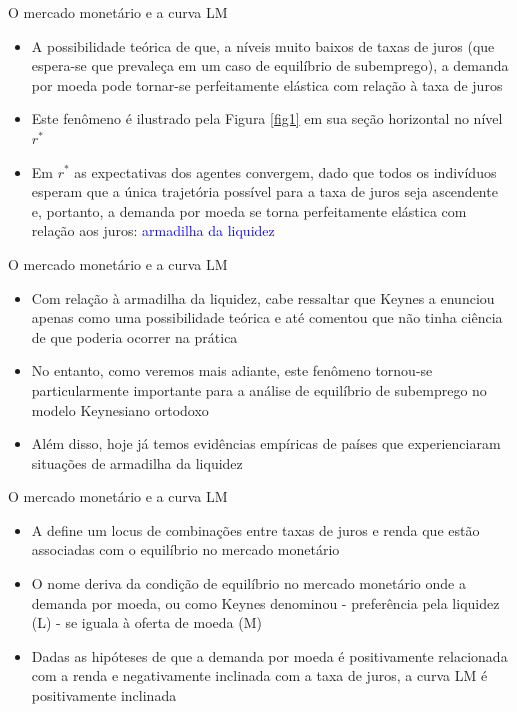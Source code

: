 \documentclass[10pt]{beamer}
\begin{document}
\begin{frame}{O mercado monetário e a curva LM}
    \begin{itemize}
        \item A possibilidade teórica de que, a níveis muito baixos de taxas de juros (que espera-se que prevaleça em um caso de equilíbrio de subemprego), a demanda por moeda pode tornar-se perfeitamente elástica com relação à taxa de juros
        \bigskip
        \item Este fenômeno é ilustrado pela Figura \ref{fig1} em sua seção horizontal no nível $r^*$
        \bigskip
        \item Em $r^*$ as expectativas dos agentes convergem, dado que todos os indivíduos esperam que a única trajetória possível para a taxa de juros seja ascendente e, portanto, a demanda por moeda se torna perfeitamente elástica com relação aos juros: \textcolor{blue}{armadilha da liquidez}
    \end{itemize}
\end{frame}

\begin{frame}{O mercado monetário e a curva LM}
    \begin{itemize}
        \item Com relação à armadilha da liquidez, cabe ressaltar que Keynes a enunciou apenas como uma possibilidade teórica e até comentou que não tinha ciência de que poderia ocorrer na prática
        \bigskip
        \item No entanto, como veremos mais adiante, este fenômeno tornou-se particularmente importante para a análise de equilíbrio de subemprego no modelo Keynesiano ortodoxo
        \bigskip
        \item Além disso, hoje já temos evidências empíricas de países que experienciaram situações de armadilha da liquidez
    \end{itemize}
\end{frame}

\begin{frame}{O mercado monetário e a curva LM}
    \begin{itemize}
        \item A  define um locus de combinações entre taxas de juros e renda que estão associadas com o equilíbrio no mercado monetário
        \bigskip
        \item O nome deriva da condição de equilíbrio no mercado monetário onde a demanda por moeda, ou como Keynes denominou - preferência pela liquidez (L) - se iguala à oferta de moeda (M)
        \bigskip
        \item Dadas as hipóteses de que a demanda por moeda é positivamente relacionada com a renda e negativamente inclinada com a taxa de juros, a curva LM é positivamente inclinada
    \end{itemize}
\end{frame}
\end{document}
